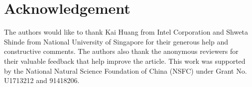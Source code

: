 \section*{Acknowledgement}

The authors would like to thank Kai Huang from Intel Corporation and Shweta Shinde from National University of Singapore for their generous help and constructive comments. The authors also thank the anonymous reviewers for their valuable feedback that help improve the article. This work was supported by the National Natural Science Foundation of China (NSFC) under Grant No. U1713212 and 91418206.

